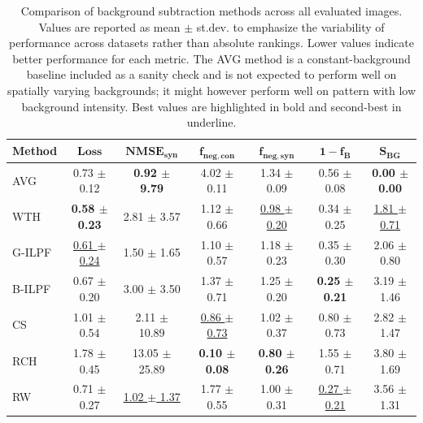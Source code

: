 \documentclass[iucr]{iucrjournals}
\begin{document}
\begin{table}[t]
\caption{Comparison of background subtraction methods across all evaluated images. Values are reported as mean $\pm$ st.dev. to emphasize the variability of performance across datasets rather than absolute rankings. Lower values indicate better performance for each metric. The AVG method is a constant-background baseline included as a sanity check and is not expected to perform well on spatially varying backgrounds; it might however perform well on pattern with low background intensity. Best values are highlighted in bold and second-best in underline.}
\label{tab:method_performance_new}
\centering
\small
\setlength{\tabcolsep}{3pt}
\renewcommand{\arraystretch}{1.1}
\begin{tabular}{@{}lcccccc@{}}
\toprule
\textbf{Method} & $\mathbf{Loss}$ & $\mathbf{NMSE}_{\mathbf{syn}}$ & $\mathbf{f}_{\mathbf{neg,con}}$ & $\mathbf{f}_{\mathbf{neg,syn}}$ & $\mathbf{1-f_B}$ & $\mathbf{S}_{\mathbf{BG}}$ \\
\midrule
AVG & 0.73 $\pm$ 0.12 & \textbf{0.92 $\pm$ 9.79} & 4.02 $\pm$ 0.11 & 1.34 $\pm$ 0.09 & 0.56 $\pm$ 0.08 & \textbf{0.00 $\pm$ 0.00} \\
WTH & \textbf{0.58 $\pm$ 0.23} & 2.81 $\pm$ 3.57 & 1.12 $\pm$ 0.66 & \underline{0.98 $\pm$ 0.20} & 0.34 $\pm$ 0.25 & \underline{1.81 $\pm$ 0.71} \\

G-ILPF & \underline{0.61 $\pm$ 0.24} & 1.50 $\pm$ 1.65 & 1.10 $\pm$ 0.57 & 1.18 $\pm$ 0.23 & 0.35 $\pm$ 0.30 & 2.06 $\pm$ 0.80 \\
B-ILPF & 0.67 $\pm$ 0.20 & 3.00 $\pm$ 3.50 & 1.37 $\pm$ 0.71 & 1.25 $\pm$ 0.20 & \textbf{0.25 $\pm$ 0.21} & 3.19 $\pm$ 1.46 \\
CS & 1.01 $\pm$ 0.54 & 2.11 $\pm$ 10.89 & \underline{0.86 $\pm$ 0.73} & 1.02 $\pm$ 0.37 & 0.80 $\pm$ 0.73 & 2.82 $\pm$ 1.47 \\

RCH & 1.78 $\pm$ 0.45 & 13.05 $\pm$ 25.89 & \textbf{0.10 $\pm$ 0.08} & \textbf{0.80 $\pm$ 0.26} & 1.55 $\pm$ 0.71 & 3.80 $\pm$ 1.69 \\

RW & 0.71 $\pm$ 0.27 & \underline{1.02 $\pm$ 1.37} & 1.77 $\pm$ 0.55 & 1.00 $\pm$ 0.31 & \underline{0.27 $\pm$ 0.21}  & 3.56 $\pm$ 1.31  \\

\bottomrule
\end{tabular}
\end{table}

    
\end{document}
